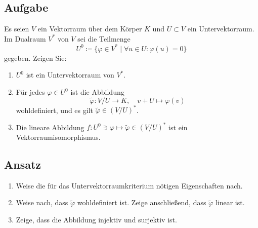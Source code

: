 \subsection{Aufgabe}
Es seien \( V \) ein Vektorraum über dem Körper \( K \) und \( U \subset V \) ein Untervektorraum. Im Dualraum \( V^\ast \) von \( V \) sei die Teilmenge
\begin{equation*}
	U^0 \coloneqq \{ \varphi \in V^\ast \mid \forall u \in U: \varphi(u) = 0 \}
\end{equation*}
gegeben. Zeigen Sie:
\begin{enumerate}
	\item \( U^0 \) ist ein Untervektorraum von \( V^\ast \).
	\item Für jedes \( \varphi \in U^0 \) ist die Abbildung
	\begin{equation*}
	 	\widetilde{\varphi}: V/U \to K, \quad v + U \mapsto \varphi(v)
	 \end{equation*} 
	 wohldefiniert, und es gilt \( \widetilde{\varphi} \in (V/U)^\ast \).
	 \item Die lineare Abbildung \( f: U^0 \ni \varphi \mapsto \widetilde{\varphi} \in (V/U)^\ast \) ist ein Vektorraumisomorphismus.
\end{enumerate}

\subsection{Ansatz}
\begin{enumerate}
	\item Weise die für das Untervektorraumkriterium nötigen Eigenschaften nach.
	\item Weise nach, dass \( \widetilde{\varphi} \) wohldefiniert ist. Zeige anschließend, dass \( \widetilde{\varphi} \) linear ist. 
	\item Zeige, dass die Abbildung injektiv und surjektiv ist.
\end{enumerate}

\newpage

